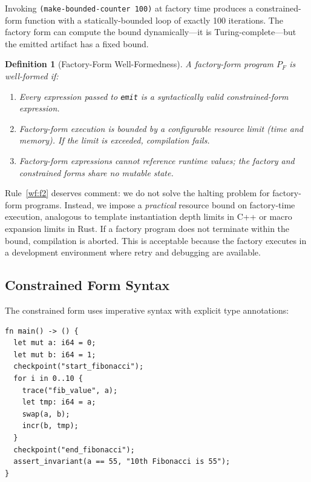 \documentclass[11pt,a4paper]{article}
\newtheorem{definition}[theorem]{Definition}
\begin{document}
Invoking \texttt{(make-bounded-counter 100)} at factory time produces a
constrained-form function with a statically-bounded loop of exactly 100
iterations.  The factory form can compute the bound dynamically---it is
Turing-complete---but the emitted artifact has a fixed bound.

\begin{definition}[Factory-Form Well-Formedness]
A factory-form program $P_F$ is well-formed if:
\begin{enumerate}[nosep,label=(F\arabic*)]
  \item\label{wf:f1} Every expression passed to \texttt{emit} is a syntactically valid
    constrained-form expression.
  \item\label{wf:f2} Factory-form execution is bounded by a configurable resource limit
    (time and memory).  If the limit is exceeded, compilation fails.
  \item\label{wf:f3} Factory-form expressions cannot reference runtime values; the
    factory and constrained forms share no mutable state.
\end{enumerate}
\end{definition}

Rule~\ref{wf:f2} deserves comment: we do not solve the halting problem for
factory-form programs.  Instead, we impose a \emph{practical} resource bound
on factory-time execution, analogous to template instantiation depth limits in
C++ or macro expansion limits in Rust.  If a factory program does not
terminate within the bound, compilation is aborted.  This is acceptable
because the factory executes in a development environment where retry and
debugging are available.

\subsection{Constrained Form Syntax}

The constrained form uses imperative syntax with explicit type annotations:

\begin{lstlisting}[language=oblibeny,caption={Constrained form---complete valid program}]
fn main() -> () {
  let mut a: i64 = 0;
  let mut b: i64 = 1;
  checkpoint("start_fibonacci");
  for i in 0..10 {
    trace("fib_value", a);
    let tmp: i64 = a;
    swap(a, b);
    incr(b, tmp);
  }
  checkpoint("end_fibonacci");
  assert_invariant(a == 55, "10th Fibonacci is 55");
}
\end{lstlisting}
\end{document}
